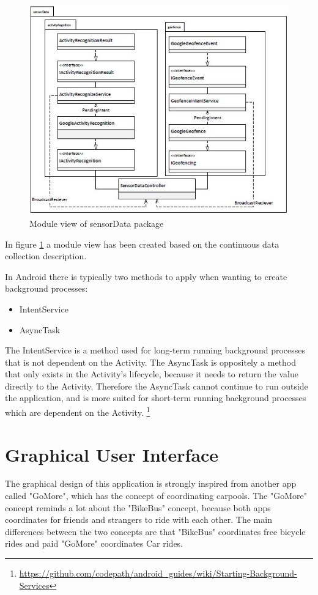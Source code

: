 \begin{figure}[H]
\centering
\includegraphics[scale=1]{Graphics/Images/Module_View_SensorData.jpg}
\caption{Module view of sensorData package}
\label{fig:Module_View_Sensor_Data}
\end{figure}
In figure \ref{fig:Module_View_Sensor_Data} a module view has been created based on the continuous data collection description. 

In Android there is typically two methods to apply when wanting to create background processes:
\begin{itemize}
    \item IntentService
    \item AsyncTask
\end{itemize}

The IntentService is a method used for long-term running background processes that is not dependent on the Activity. The AsyncTask is oppositely a method that only exists in the Activity's lifecycle, because it needs to return the value directly to the Activity. Therefore the AsyncTask cannot continue to run outside the application, and is more suited for short-term running background processes which are dependent on the Activity. 
\footnote{\url{https://github.com/codepath/android_guides/wiki/Starting-Background-Services}}

\section{Graphical User Interface}
The graphical design of this application is strongly inspired from another app called "GoMore", which has the concept of coordinating carpools. The "GoMore" concept reminds a lot about the "BikeBus" concept, because both apps coordinates for friends and strangers to ride with each other. The main differences between the two concepts are that "BikeBus" coordinates free bicycle rides and paid "GoMore" coordinates Car rides.

